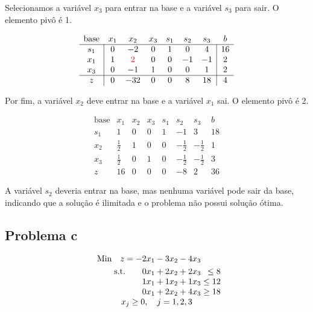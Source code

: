 \documentclass{article}
\begin{document}
Selecionamos a variável $x_3$ para entrar na base e a variável $s_3$ para sair.
O elemento pivô é 1.

\[
  \begin{array}{c|cccccc|c}
    \text{base} & x_1 & x_2 & x_3 & s_1 & s_2 & s_3 & b \\ \hline
            s_1 &   0 &  -2 &   0 &   1 &   0 &   4 & 16 \\
            x_1 &   1 & \color{red}2\color{black} &   0 &   0 &  -1 &  -1 & 2 \\
            x_3 &   0 &  -1 &   1 &   0 &   0 &   1 & 2 \\ \hline
              z &   0 & -32 &   0 &   0 &   8 &  18 & 4
  \end{array}
\]

Por fim, a variável $x_2$ deve entrar na base e a variável $x_1$ sai.
O elemento pivô é 2.

\[
  \begin{array}{c|cccccc|c}
    \text{base} &         x_1 & x_2 & x_3 & s_1 &          s_2 &          s_3 & b  \\ \hline
            s_1 &           1 &   0 &   0 &   1 &           -1 &            3 & 18 \\
            x_2 & \frac{1}{2} &   1 &   0 &   0 & -\frac{1}{2} & -\frac{1}{2} & 1  \\
            x_3 & \frac{1}{2} &   0 &   1 &   0 & -\frac{1}{2} & -\frac{1}{2} & 3  \\ \hline
              z &          16 &   0 &   0 &   0 &           -8 &            2 & 36
  \end{array}
\]

A variável $s_2$ deveria entrar na base, mas nenhuma variável pode sair da base, indicando que a solução é ilimitada e o problema não possui solução ótima.


\subsection{Problema c}

\[
  \begin{array}{r@{}r@{}r@{}r@{}r@{}r}
    \text{Min} \quad z = -2x_1 &{} - 3x_2 &{} -  4x_3 &{} \\[\jot]
    \text{s.t.}\quad\quad 0x_1 &{} + 2x_2 &{} +  2x_3 &{} \leq 8 \\
                          1x_1 &{} + 1x_2 &{} +  1x_3 &{} \leq 12 \\
                          0x_1 &{} + 2x_2 &{} +  4x_3 &{} \geq 18 \\

    \multicolumn{4}{c}{x_j \geq 0, \quad j=1, 2, 3}
  \end{array}
\]
\end{document}
